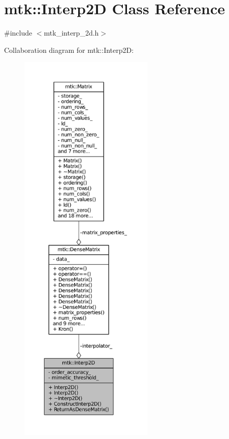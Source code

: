 \hypertarget{classmtk_1_1Interp2D}{\section{mtk\+:\+:Interp2\+D Class Reference}
\label{classmtk_1_1Interp2D}
}


{\ttfamily \#include $<$mtk\+\_\+interp\+\_\+2d.\+h$>$}



Collaboration diagram for mtk\+:\+:Interp2\+D\+:\nopagebreak
\begin{figure}[H]
\begin{center}
\leavevmode
\includegraphics[height=550pt]{classmtk_1_1Interp2D__coll__graph}
\end{center}
\end{figure}
